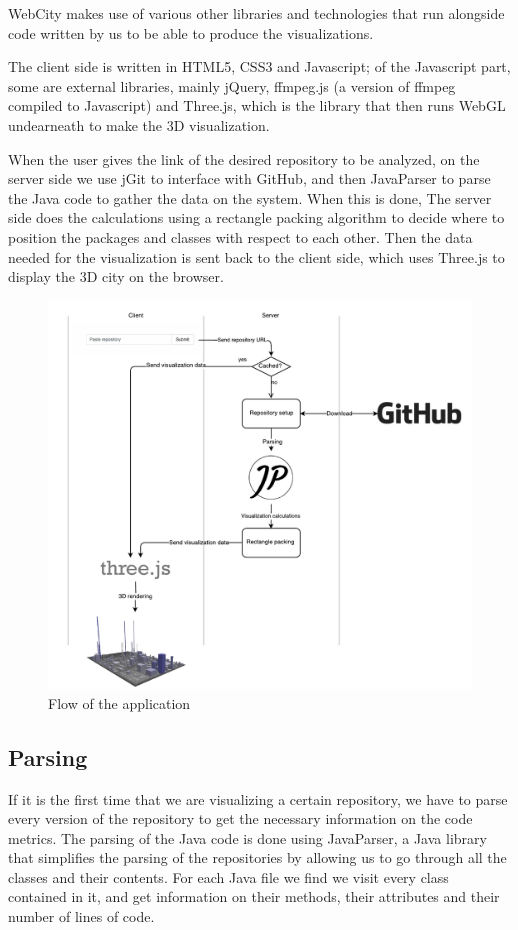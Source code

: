 \documentclass[]{usiinfbachelorproject}
\begin{document}
WebCity makes use of various other libraries and technologies that run alongside code written by us to be able to produce the visualizations.

The client side is written in HTML5, CSS3 and Javascript; of the Javascript part, some are external libraries, mainly jQuery, ffmpeg.js (a version of ffmpeg compiled to Javascript) and Three.js, which is the library that then runs WebGL undearneath to make the 3D visualization.

When the user gives the link of the desired repository to be analyzed, on the server side we use jGit to interface with GitHub, and then JavaParser to parse the Java code to gather the data on the system. When this is done, The server side does the calculations using a rectangle packing algorithm to decide where to position the packages and classes with respect to each other. Then the data needed for the visualization is sent back to the client side, which uses Three.js to display the 3D city on the browser.

\begin{figure} [H]
\centering
\includegraphics[width=1\textwidth]{pictures/flow.pdf}
\caption{Flow of the application}
\label{fig:flow}
\end{figure}

\subsection{Parsing} \label{Parsing}
If it is the first time that we are visualizing a certain repository, we have to parse every version of the repository to get the necessary information on the code metrics.
The parsing of the Java code is done using JavaParser, a Java library that simplifies the parsing of the repositories by allowing us to go through all the classes and their contents.
For each Java file we find we visit every class contained in it, and get information on their methods, their attributes and their number of lines of code.
\end{document}
